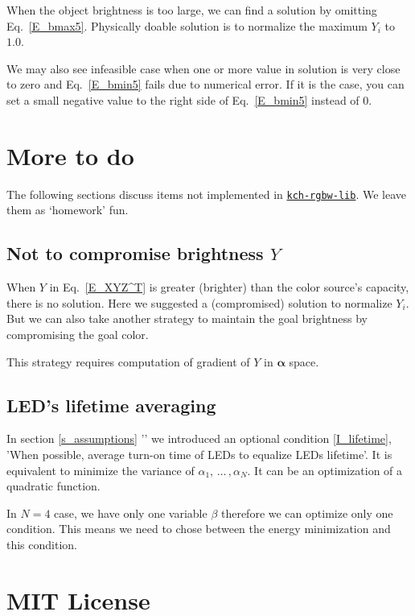 \documentclass[dvipdfmx,a4paper]{article}
\begin{document}
When the object brightness is too large, we can find a solution by omitting Eq.~\eqref{E_bmax5}. Physically doable solution is to normalize the maximum $Y_i$ to $1.0$.

We may also see infeasible case when one or more value in solution is very close to zero and Eq.~\eqref{E_bmin5} fails due to numerical error. If it is the case, you can set a small negative value to the right side of Eq.~\eqref{E_bmin5} instead of $0$.



\section{More to do}

The following sections discuss items not implemented in \href{https://www.npmjs.com/package/kch-rgbw-lib}{\texttt{kch-rgbw-lib}}. We leave them as `homework' fun.

\subsection{Not to compromise brightness $Y$}
When $Y$ in Eq.~\eqref{E_XYZ^T} is greater (brighter) than the color source's capacity, there is no solution. Here we suggested a (compromised) solution to normalize $Y_i$. But we can also take another strategy to maintain the goal brightness by compromising the goal color.

This strategy requires computation of gradient of $Y$ in $\boldsymbol{\alpha}$ space.


\subsection{LED's lifetime averaging}
In section \ref{s_assumptions} '' we introduced an optional condition \ref{I_lifetime}, 'When possible, average turn-on time of LEDs to equalize LEDs lifetime'. It is equivalent to minimize the variance of $\alpha_1, \, \ldots\, , \alpha_N$. It can be an optimization of a quadratic function.

In $N = 4$ case, we have only one variable $\beta$ therefore we can optimize only one condition. This means we need to chose between the energy minimization and this condition.






\section*{MIT License}
\end{document}

